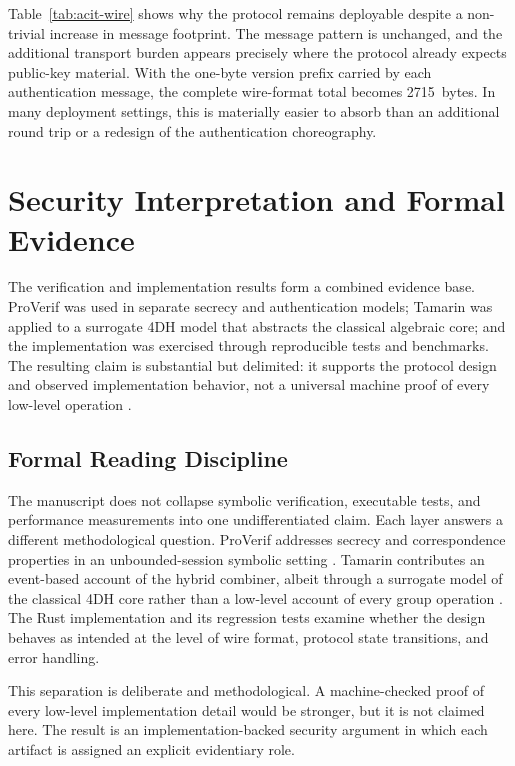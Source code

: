 \documentclass[conference]{IEEEtran}
\begin{document}
Table~\ref{tab:acit-wire} shows why the protocol remains deployable despite a non-trivial increase in message footprint. The message pattern is unchanged, and the additional transport burden appears precisely where the protocol already expects public-key material. With the one-byte version prefix carried by each authentication message, the complete wire-format total becomes 2715~bytes. In many deployment settings, this is materially easier to absorb than an additional round trip or a redesign of the authentication choreography.

\section{Security Interpretation and Formal Evidence}

The verification and implementation results form a combined evidence base. ProVerif was used in separate secrecy and authentication models; Tamarin was applied to a surrogate 4DH model that abstracts the classical algebraic core; and the implementation was exercised through reproducible tests and benchmarks. The resulting claim is substantial but delimited: it supports the protocol design and observed implementation behavior, not a universal machine proof of every low-level operation \cite{cremers2012,basin2018}.

\subsection{Formal Reading Discipline}

The manuscript does not collapse symbolic verification, executable tests, and performance measurements into one undifferentiated claim. Each layer answers a different methodological question. ProVerif addresses secrecy and correspondence properties in an unbounded-session symbolic setting \cite{blanchet2016}. Tamarin contributes an event-based account of the hybrid combiner, albeit through a surrogate model of the classical 4DH core rather than a low-level account of every group operation \cite{tamarin2013}. The Rust implementation and its regression tests examine whether the design behaves as intended at the level of wire format, protocol state transitions, and error handling.

This separation is deliberate and methodological. A machine-checked proof of every low-level implementation detail would be stronger, but it is not claimed here. The result is an implementation-backed security argument in which each artifact is assigned an explicit evidentiary role.
\end{document}
